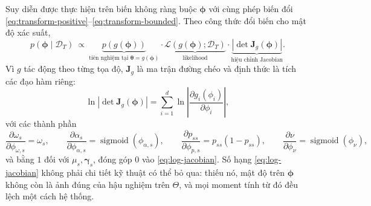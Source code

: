 \documentclass[12pt,a4paper]{article}
\numberwithin{equation}{section}
\theoremstyle{definition}
\newcommand{\sigmoid}{\operatorname{sigmoid}}
\newcommand{\Data}{\mathcal{D}}
\newcommand{\Param}{\symbf{\theta}}
\newcommand{\bmgamma}{\symbf{\gamma}}
\newcommand{\vecphi}{\symbf{\phi}}
\begin{document}
Suy diễn được thực hiện trên biến không ràng buộc $\vecphi$ với cùng phép biến đổi
\eqref{eq:transform-positive}--\eqref{eq:transform-bounded}. Theo công thức đổi biến cho
mật độ xác suất,
\begin{equation}
  p\!\left(\vecphi\mid\Data_T\right)\ \propto\
  \underbrace{p\!\left(g(\vecphi)\right)}_{\text{tiên nghiệm tại }\Param=g(\vecphi)}
  \cdot
  \underbrace{\mathcal{L}\!\left(g(\vecphi);\Data_T\right)}_{\text{likelihood}}
  \cdot
  \underbrace{\left|\det\symbf J_g(\vecphi)\right|}_{\text{hiệu chỉnh Jacobian}}.
  \label{eq:posterior-unconstrained}
\end{equation}
Vì $g$ tác động theo từng tọa độ, $\symbf J_g$ là ma trận đường chéo và định thức là tích
các đạo hàm riêng:
\begin{equation}
  \ln\left|\det\symbf J_g(\vecphi)\right|
  =\sum_{i=1}^{d}\ln\left|\frac{\partial g_i(\phi_i)}{\partial\phi_i}\right|,
  \label{eq:log-jacobian}
\end{equation}
với các thành phần
\begin{equation}
  \frac{\partial\omega_s}{\partial\phi_{\omega,s}}=\omega_s,\qquad
  \frac{\partial\alpha_s}{\partial\phi_{\alpha,s}}=\sigmoid(\phi_{\alpha,s}),\qquad
  \frac{\partial p_{ss}}{\partial\phi_{p,s}}=p_{ss}\left(1-p_{ss}\right),\qquad
  \frac{\partial\nu}{\partial\phi_{\nu}}=\sigmoid(\phi_{\nu}),
  \label{eq:jacobian-terms}
\end{equation}
và bằng $1$ đối với $\mu_s,\bmgamma_s$, đóng góp $0$ vào \eqref{eq:log-jacobian}. Số hạng
\eqref{eq:log-jacobian} không phải chi tiết kỹ thuật có thể bỏ qua: thiếu nó, mật độ trên
$\vecphi$ không còn là ảnh đúng của hậu nghiệm trên $\Theta$, và mọi moment tính từ đó
đều lệch một cách hệ thống.
\end{document}

